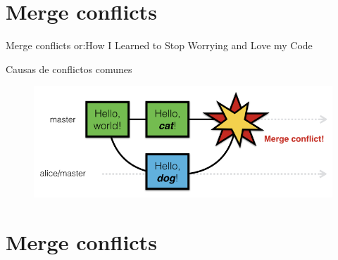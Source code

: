 \documentclass[10pt]{beamer}
\begin{document}
\section{Merge conflicts}

\begin{frame}{Merge conflicts or:}{How I Learned to Stop Worrying and Love my Code \heartsuit}

\begin{block}{Causas de conflictos comunes}

\begin{figure}[h!]
\centering
\includegraphics [scale=0.6]{step2}
\label{fig:issues}
\end{figure}
    
\end{block}

\end{frame}

\section{Merge conflicts}
\end{document}
